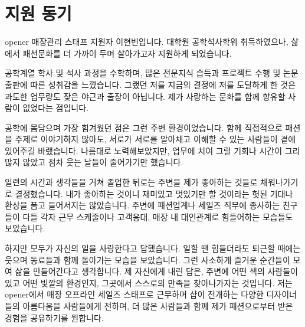 \section*{지원 동기}
opener 매장관리 스태프 지원자 이현빈입니다. 대학원 공학석사학위 취득하였으나, 삶에서 패션문화를 더 가까이 두며 살아가고자 지원하게 되었습니다.

공학계열 학사 및 석사 과정을 수학하며, 많은 전문지식 습득과 프로젝트 수행 및 논문출판에 따른 성취감을 느꼈습니다. 그랬던 저를 지금의 결정에 저를 도달하게 한 것은 과도한 업무량도 잦은 야근과 출장이 아닙니다. 제가 사랑하는 문화를 함께 향유할 사람이 없었다는 점입니다.

공학에 몸담으며 가장 힘겨웠던 점은 그런 주변 환경이었습니다. 함께 직접적으로 패션을 주제로 이야기하지 않아도, 서로가 서로를 알아채고 이해할 수 있는 사람들이 곁에 있어주길 바랬습니다. 나름대로 노력해보았지만, 업무에 치여 그럴 기회나 시간이 그리 많지 않았고 점차 웃는 날들이 줄어가기만 했습니다.

일련의 시간과 생각들을 거쳐 졸업한 뒤로는 주변을 제가 좋아하는 것들로 채워나가기로 결정했습니다. 내가 좋아하는 것이니 재미있고 멋있기만 할 것이라는 헛된 기대나 환상을 품고 들어서지는 않았습니다. 주변에 패션업계나 세일즈 직무에 종사하는 친구들이 다들 각자 근무 스케줄이나 고객응대, 매장 내 대인관계로 힘들어하는 모습들도 보았습니다.

하지만 모두가 자신의 일을 사랑한다고 답했습니다. 일할 땐 힘들더라도 퇴근할 때에는 웃으며 동료들과 함께 돌아가는 모습을 보았습니다. 그런 사소하게 즐거운 순간들이 모여 삶을 만들어간다고 생각합니다. 제 자신에게 내린 답은, 주변에 어떤 색의 사람들이 있고 어떤 빛깔의 환경인지, 그곳에서 스스로의 만족을 찾아나가자는 것입니다.
저는 opener에서 매장 오프라인 세일즈 스태프로 근무하며 샵이 전개하는 다양한 디자이너들의 아름다움을 사람들에게 전하며, 더 많은 사람들과 함께 제가 패션으로부터 받은 경험을 공유하기를 원합니다.



